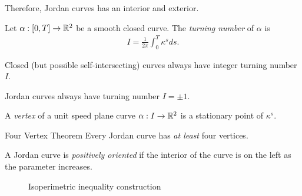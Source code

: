 \begin{rmk}
    Therefore, Jordan curves has an interior and exterior.
\end{rmk}

\begin{defn}
    Let $\alpha: [0, T] \to \mathbb{R}^2$ be a smooth closed curve. The \emph{turning number} of $\alpha$ is
    \begin{align*}
        I = \frac{1}{2\pi}\int_{0}^{T}\kappa^{s}ds.
    \end{align*}
\end{defn}

\begin{thm}
    Closed (but possible self-intersecting) curves always have integer turning number $I$.
\end{thm}

\begin{thm}
    Jordan curves always have turning number $I = \pm 1$.
\end{thm}

\begin{defn}
    A \emph{vertex} of a unit speed plane curve $\alpha: I \to \mathbb{R}^2$ is a stationary point of $\kappa^{s}$.
\end{defn}

\begin{thm}{Four Vertex Theorem}\label{thm:four-vertex-theorem}\proofbreak
    Every Jordan curve has \emph{at least} four vertices.
\end{thm}

\begin{defn}
    A Jordan curve is \emph{positively oriented} if the interior of the curve is on the left as the parameter increases.
\end{defn}

\begin{figure}[ht!]
    \centering
\caption{Isoperimetric inequality construction}
\label{fig:isoperimetric-construction}
\end{figure}

